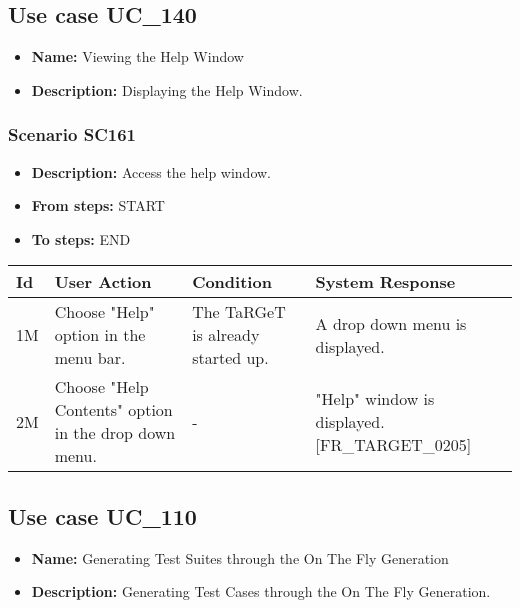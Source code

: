 \documentclass[a4paper,11pt]{article}
\newcommand{\bl}{\\ \hline}
\begin{document}
\subsection*{Use case UC_140}
\begin{itemize}
\item {\bf Name: }Viewing the Help Window
\item {\bf Description: } Displaying the Help Window.
\end{itemize}
\subsubsection*{Scenario SC161}
\begin{itemize}
\item {\bf Description:} Access the help window.
\item {\bf From steps:} START
\item {\bf To steps:} END
\end{itemize}
\begin{tabular}{|p{0.4in}|p{1.5in}|p{1.5in}|p{1.5in}|}
\hline
Id & User Action & Condition & System Response \bl 
1M & Choose "Help" option in the menu bar. & The TaRGeT is already started up. & A drop down menu is displayed. \bl
2M & Choose "Help Contents" option in the drop down menu.
					 & - & "Help" window is displayed. [FR_TARGET_0205]\bl
\end{tabular}
\subsection*{Use case UC_110}
\begin{itemize}
\item {\bf Name: }Generating Test Suites through the On The Fly Generation
\item {\bf Description: }Generating Test Cases through the On The Fly Generation.
			
\end{itemize}
\end{document}
